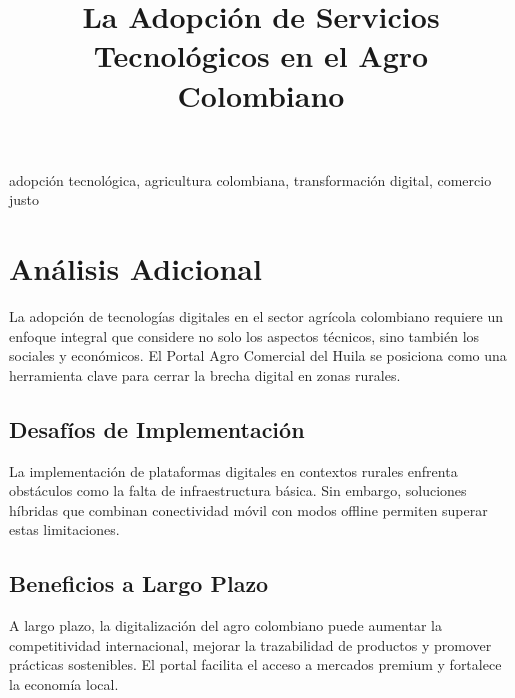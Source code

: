 \documentclass[conference]{IEEEtran}
\begin{document}
\title{La Adopción de Servicios Tecnológicos en el Agro Colombiano}

\author{
}

\maketitle

\begin{abstract}

\end{abstract}

\begin{IEEEkeywords}
adopción tecnológica, agricultura colombiana, transformación digital, comercio justo
\end{IEEEkeywords}









\section{Análisis Adicional}

La adopción de tecnologías digitales en el sector agrícola colombiano requiere un enfoque integral que considere no solo los aspectos técnicos, sino también los sociales y económicos. El Portal Agro Comercial del Huila se posiciona como una herramienta clave para cerrar la brecha digital en zonas rurales.

\subsection{Desafíos de Implementación}
La implementación de plataformas digitales en contextos rurales enfrenta obstáculos como la falta de infraestructura básica. Sin embargo, soluciones híbridas que combinan conectividad móvil con modos offline permiten superar estas limitaciones.

\subsection{Beneficios a Largo Plazo}
A largo plazo, la digitalización del agro colombiano puede aumentar la competitividad internacional, mejorar la trazabilidad de productos y promover prácticas sostenibles. El portal facilita el acceso a mercados premium y fortalece la economía local.
\end{document}
